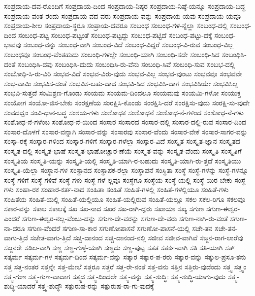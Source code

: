 {ಸಂಪ್ರದಾಯ-ದವ-ರೊಂದಿಗೆ
ಸಂಪ್ರದಾಯ-ದಿಂದ
ಸಂಪ್ರದಾಯ-ನಿಷ್ಠರ
ಸಂಪ್ರದಾಯ-ನಿಷ್ಠೆ-ಯನ್ನೂ
ಸಂಪ್ರದಾಯ-ಬದ್ಧ
ಸಂಪ್ರದಾಯ-ವಂತ-ರೆಂದು
ಸಂಪ್ರದಾಯ-ವದ-ವರು
ಸಂಪ್ರದಾಯ-ವನ್ನು
ಸಂಪ್ರದಾಯ-ಯವು
ಸಂಪ್ರದಾಯ-ಯವೂ
ಸಂಪ್ರದಾಯ-ಶೀಲ
ಸಂಪ್ರದಾಯ-ಸ್ಥರೂ
ಸಂಪ್ರಾಯ-ದವರೂ
ಸಂಬಂಧ
ಸಂಬಂಧ-ಗಳ-ನ್ನೆಲ್ಲಾ
ಸಂಬಂಧ-ದಲ್ಲಿ
ಸಂಬಂಧ-ದಿಂದ
ಸಂಬಂಧ-ಪಟ್ಟ
ಸಂಬಂಧ-ಪಟ್ಟಂತೆ
ಸಂಬಂಧ-ಪಟ್ಟದ್ದು
ಸಂಬಂಧ-ಪಟ್ಟಿದೆ
ಸಂಬಂಧ-ಪಟ್ಟು-ದಕ್ಕೆ
ಸಂಬಂಧ-ಭಾವವು
ಸಂಬಂಧ-ವನ್ನು
ಸಂಬಂಧ-ವಾಗಿ
ಸಂಬಂಧ-ವಿದೆ
ಸಂಬಂಧ-ವಿದ್ದರೆ
ಸಂಬಂಧ-ವಿ-ರುವ
ಸಂಬಂಧ-ವಿಲ್ಲ
ಸಂಬಂಧವೂ
ಸಂಬಂಧ-ವೆಂತಹುದು
ಸಂಬಂಧಿ-ಗಳಲ್ಲೇ
ಸಂಬಂಧಿ-ಯಾಗಿ
ಸಂಬಂಧಿ-ಸದೇ
ಸಂಬಂಧಿ-ಸಿದ
ಸಂಬಂಧಿಸಿ-ದಂತೆ
ಸಂಬಂಧಿಸಿ-ದವು
ಸಂಬಂಧಿಸಿ-ದುದು
ಸಂಬಂಧಿಸಿ-ರು-ವೆನು
ಸಂಬಂಧಿ-ಸಿವೆ
ಸಂಬಂಧಿ-ಸುವ
ಸಂಬಭ-ದಲ್ಲಿ
ಸಂಬೋಧಿ-ಸಿ-ರು-ವಿರಿ
ಸಂಭವ-ವಿದೆ
ಸಂಭವ-ವಿರು-ವುದು
ಸಂಭವ-ವಿಲ್ಲ
ಸಂಭವ-ವುಂಟು
ಸಂಭವವೂ
ಸಂಭವವೇ
ಸಂಭ-ವಾಮಿ
ಸಂಭವಿಸ-ದಂತೆ
ಸಂಭವಿಸ-ಬಹು-ದಾದ
ಸಂಭವಿ-ಸಿದ
ಸಂಭವಿಸಿ-ದಾಗ
ಸಂಭವಿಸಿಯೇ
ಸಂಭವಿಸಿಲ್ಲ
ಸಂಭವಿ-ಸುತ್ತದೆ
ಸಂಮಿಶ್ರಣ-ಗೊಂಡು
ಸಂಯಮ
ಸಂಯಮ-ದಿಂದಲೂ
ಸಂಯಮವು
ಸಂಯಮಿ-ಗಳೋ
ಸಂಯುಕ್ತ
ಸಂಯೋಗ
ಸಂಯೋ-ಜಿಸ-ಬೇಕು
ಸಂರಕ್ಷಣೆಯ
ಸಂರಕ್ಷಿಸಿ-ಕೊಂಡು
ಸಂರಕ್ಷಿಸಿ-ದರೆ
ಸಂರಕ್ಷಿಸು-ವುದು
ಸಂರಕ್ಷಿ-ಸು-ವುದೇ
ಸಂವದಧ್ವಂ
ಸಂವಿ-ಧಾನ-ಬದ್ಧ
ಸಂಶಯ-ಗಳು
ಸಂಶೋಧಕ
ಸಂಶೋಧನೆ
ಸಂಶೋಧ-ನೆ-ಗಳಿಂದ
ಸಂಶೋಧ-ನೆ-ಗಳು
ಸಂಶೋಧ-ನೆ-ಗಳೆಂಬ
ಸಂಶೋಧ-ನೆ-ಯಿಂದ
ಸಂಸಾರ
ಸಂಸಾರದ
ಸಂಸಾರ-ದಲ್ಲಿ
ಸಂಸಾರ-ದಲ್ಲಿ-ರುವ
ಸಂಸಾರ-ದಿಂದ
ಸಂಸಾರ-ದೊಳಗೆ
ಸಂಸಾರ-ವನ್ನಾಗಿ
ಸಂಸಾರ-ವನ್ನು
ಸಂಸಾರವು
ಸಂಸಾರ-ವೆಂದು
ಸಂಸಾರ-ವೇಕೆ
ಸಂಸಾರ-ಸಾಗರ-ವನ್ನು
ಸಂಸ್ಕಾ-ರಕ್ಕೆ
ಸಂಸ್ಕಾರ-ಗಳಿಂದ
ಸಂಸ್ಕಾರ-ಗಳಿಗೆ
ಸಂಸ್ಕಾರ-ಗಳೆಲ್ಲಾ
ಸಂಸ್ಕಾರ-ವಿದೆ
ಸಂಸ್ಕೃತ
ಸಂಸ್ಕೃತ-ಜ್ಞಾನ
ಸಂಸ್ಕೃತದ
ಸಂಸ್ಕೃತ-ದಲ್ಲಿ
ಸಂಸ್ಕೃತ-ಭಾಷೆ
ಸಂಸ್ಕೃತ-ಭಾಷೋಚ್ಚಾರ-ಣೆಯೆ
ಸಂಸ್ಕೃತ-ವನ್ನು
ಸಂಸ್ಕೃತ-ವೆಂದು
ಸಂಸ್ಕೃತಿ
ಸಂಸ್ಕೃತಿಗೆ
ಸಂಸ್ಕೃತಿಯ
ಸಂಸ್ಕೃತಿ-ಯನ್ನು
ಸಂಸ್ಕೃತಿ-ಯಲ್ಲಿ
ಸಂಸ್ಕೃತಿ-ಯಾಗಿ-ರ-ಬಹುದು
ಸಂಸ್ಕೃತಿ-ಯಾಗಿ-ರು-ತ್ತದೆ
ಸಂಸ್ಕೃತಿಯು
ಸಂಸ್ಕೃತಿ-ಯೆಲ್ಲಾ
ಸಂಸ್ಥಾನ-ಗಳ
ಸಂಸ್ಥಾನದ
ಸಂಸ್ಥಾಪಕ-ರೆಲ್ಲಾ
ಸಂಸ್ಥಾಪನೆ
ಸಂಸ್ಥಿತಾ
ಸಂಸ್ಥೆ
ಸಂಸ್ಥೆ-ಗಳನ್ನು
ಸಂಸ್ಥೆ-ಗಳನ್ನೂ
ಸಂಸ್ಥೆ-ಗಳಿಗೆ
ಸಂಸ್ಥೆ-ಗಳಿವೆ
ಸಂಸ್ಥೆ-ಗಳು
ಸಂಸ್ಥೆ-ಗಳೆ-ಲ್ಲವೂ
ಸಂಸ್ಥೆಗೂ
ಸಂಸ್ಥೆಯ
ಸಂಸ್ಥೆ-ಯಲ್ಲಿ
ಸಂಸ್ಥೆ-ಯಿರ-ಬೇಕು
ಸಂಸ್ಧೆ-ಗಳು
ಸಂಹಾ-ರಕ
ಸಂಹಾರ-ಕರ್ತ-ನಾದ
ಸಂಹಿತಾ
ಸಂಹಿತೆ
ಸಂಹಿತೆ-ಗಳಲ್ಲಿ
ಸಂಹಿತೆ-ಗಳಲ್ಲಿಯೂ
ಸಂಹಿತೆ-ಗಳು
ಸಂಹಿತೆಯ
ಸಂಹಿತೆ-ಯಲ್ಲಿ
ಸಂಹಿತೆ-ಯಲ್ಲಿಯೂ
ಸಂಹಿತೆ-ಯಲ್ಲಿರುವ
ಸಂಹಿತೆ-ಯಲ್ಲೂ
ಸಕಲ
ಸಕಲ-ರಿಗೂ
ಸಕಲವೂ
ಸಕಾರ-ವನ್ನು
ಸಕಾಲ
ಸಕಾಲಕ್ಕೆ
ಸಖ
ಸಖ-ನಾದ
ಸಖರ
ಸಖ-ರಾಗಿ-ದ್ದರು
ಸಖಾಯಾ
ಸಖ್ಯ
ಸಗುಣ
ಸಗುಣ-ಈಶ್ವರ-ಎಂದರೆ
ಸಗುಣ-ಈಶ್ವರ-ನಲ್ಲ-ವೆಂಬು-ದನ್ನು
ಸಗುಣ-ದೇ-ವರನ್ನು
ಸಗುಣ-ದೇ-ವರು
ಸಗುಣ-ನಾಗಿ-ರು-ವಂತೆ
ಸಗುಣ-ನಾ-ದರೂ
ಸಗುಣ-ವೆಂದರೆ
ಸಗುಣ-ಸಾ-ಕಾರ
ಸಗುಣೋಪಾಸನೆ
ಸಗುಣೋ-ಪಾಸನೆ-ಯಲ್ಲಿ
ಸಚೇ-ತನ
ಸಚೇ-ತನ-ವಾಗು-ತ್ತಿದೆ
ಸಚೇತ-ವಾಗು-ತ್ತಿದೆ
ಸಚ್ಚಿ-ದಾನಂದ
ಸಚ್ಚಿ-ದಾನಂದ-ನಲ್ಲಿ
ಸಜೀವ
ಸಜೀವ-ವಾಗಿವೆ
ಸಜ್ಜನ-ರಾಗ-ಲಾರೆವು
ಸಜ್ಜನರೇ
ಸಡಿಲ-ವಾಗಿ
ಸಣ್ಣ
ಸಣ್ಣ-ಗುಳ್ಳೆ-ಯಾಗಿ
ಸಣ್ಣದು
ಸಣ್ಣ-ಪುಟ್ಟ
ಸತತ
ಸತರ್ಕ-ವಾಗಿ
ಸತಿ
ಸತಿ-ಯಾಗಿ
ಸತ್
ಸತ್ಕರ್ಮ
ಸತ್ಕರ್ಮ-ಗಳ
ಸತ್ಕರ್ಮ-ದಿಂದ
ಸತ್ಕರ್ಮ-ವನ್ನು
ಸತ್ಕಾರ
ಸತ್ಕಾರ-ಪ-ರರು
ಸತ್ಕಾರ-ವನ್ನು
ಸತ್ಕುಲ-ಪ್ರಸೂ-ತನು
ಸತ್ತ
ಸತ್ತ-ನಂತರ
ಸತ್ತನ್ನೇ
ಸತ್ತ-ಮೇಲೆ
ಸತ್ತರೂ
ಸತ್ತರೆ
ಸತ್ತ-ರೇ-ನಂತೆ
ಸತ್ತ-ವನು
ಸತ್ತಿನ
ಸತ್ತಿರು-ವುದೆಂದು
ಸತ್ತ್ವ
ಸತ್ತ್ವಂ
ಸತ್ತ್ವ-ಗುಣ
ಸತ್ತ್ವ-ಗುಣ-ವಾದಾಗ
ಸತ್ತ್ವದ
ಸತ್ತ್ವ-ದಿಂದಲೇ
ಸತ್ತ್ವ-ವನ್ನು
ಸತ್ತ್ವ-ಶುದ್ಧಿಃ
ಸತ್ತ್ವ-ಶುದ್ಧಿ-ಯಾಗು-ವುದು
ಸತ್ತ್ವ-ಶುದ್ಧಿ-ಯಾದರೆ
ಸತ್ತ್ವ-ಶುದ್ಧೌ
ಸತ್ಪುರುಷ-ರನ್ನು
ಸತ್ಪುರುಷ-ರಾ-ಗು-ವುದಕ್ಕೆ
}
